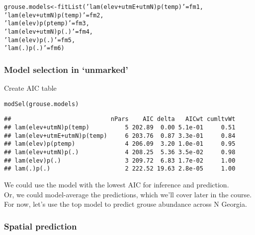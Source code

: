 \documentclass[color=usenames,dvipsnames]{beamer}\usepackage[]{graphicx}\usepackage[]{color}
\makeatletter
\newcommand{\hlstr}[1]{\textcolor[rgb]{0.749,0.012,0.012}{#1}}%
\newcommand{\hlstd}[1]{\textcolor[rgb]{0,0,0}{#1}}%
\newcommand{\hlkwb}[1]{\textcolor[rgb]{0,0.341,0.682}{#1}}%
\newcommand{\hlkwd}[1]{\textcolor[rgb]{0.004,0.004,0.506}{#1}}%
\newenvironment{kframe}{%
 \def\at@end@of@kframe{}%
 \ifinner\ifhmode%
  \def\at@end@of@kframe{\end{minipage}}%
  \begin{minipage}{\columnwidth}%
 \fi\fi%
 \def\FrameCommand##1{\hskip\@totalleftmargin \hskip-\fboxsep
 \colorbox{shadecolor}{##1}\hskip-\fboxsep
     \hskip-\linewidth \hskip-\@totalleftmargin \hskip\columnwidth}%
 \MakeFramed {\advance\hsize-\width
   \@totalleftmargin\z@ \linewidth\hsize
   \@setminipage}}%
 {\par\unskip\endMakeFramed%
 \at@end@of@kframe}
\newenvironment{knitrout}{}{} %
\makeatother
\begin{document}
\begin{frame}[fragile]
\begin{knitrout}
\begin{kframe}
\begin{alltt}
\hlstd{grouse.models} \hlkwb{<-} \hlkwd{fitList}\hlstd{(}\hlstr{'lam(elev+utmE+utmN)p(temp)'}\hlstd{=fm1,}
                         \hlstr{'lam(elev+utmN)p(temp)'}\hlstd{=fm2,}
                         \hlstr{'lam(elev)p(ptemp)'}\hlstd{=fm3,}
                         \hlstr{'lam(elev+utmN)p(.)'}\hlstd{=fm4,}
                         \hlstr{'lam(elev)p(.)'}\hlstd{=fm5,}
                         \hlstr{'lam(.)p(.)'}\hlstd{=fm6)}
\end{alltt}
\end{kframe}
\end{knitrout}
\end{frame}




\begin{frame}[fragile]
  \frametitle{Model selection in `unmarked'}
  \small
  Create AIC table
\begin{knitrout}\scriptsize
{}\color{fgcolor}\begin{kframe}
\begin{alltt}
\hlkwd{modSel}\hlstd{(grouse.models)}
\end{alltt}
\begin{verbatim}
##                            nPars    AIC delta   AICwt cumltvWt
## lam(elev+utmN)p(temp)          5 202.89  0.00 5.1e-01     0.51
## lam(elev+utmE+utmN)p(temp)     6 203.76  0.87 3.3e-01     0.84
## lam(elev)p(ptemp)              4 206.09  3.20 1.0e-01     0.95
## lam(elev+utmN)p(.)             4 208.25  5.36 3.5e-02     0.98
## lam(elev)p(.)                  3 209.72  6.83 1.7e-02     1.00
## lam(.)p(.)                     2 222.52 19.63 2.8e-05     1.00
\end{verbatim}
\end{kframe}
\end{knitrout}
  \pause
  \vfill
  We could use the model with the lowest AIC for inference and
  prediction. \\ 
  \pause
  \vfill
  Or, we could model-average the predictions, which we'll cover later
  in the course. \\
  \pause
  \vfill
  For now, let's use the top model to predict grouse abundance across
  N Georgia.
\end{frame}


\subsubsection{Spatial prediction}
\end{document}
